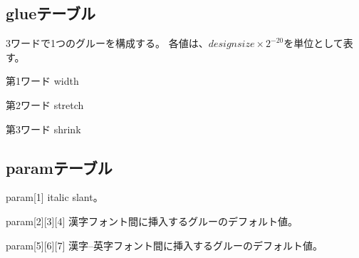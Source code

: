 ﻿\documentclass[twoside]{jarticle}
\begin{document}
\subsection{glueテーブル}
3ワードで1つのグルーを構成する。
各値は、$design size\times2^{-20}$を単位として表す。
\begin{description}
\item{第1ワード} width
\item{第2ワード} stretch
\item{第3ワード} shrink
\end{description}
\subsection{paramテーブル}
\begin{description}
\item{param[1]} italic slant。
\item{param[2][3][4]} 漢字フォント間に挿入するグルーのデフォルト値。
\item{param[5][6][7]} 漢字--英字フォント間に挿入するグルーのデフォルト値。
\end{description}
\newpage
\end{document}
